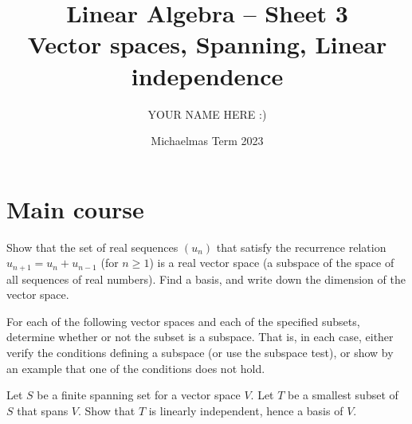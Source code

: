 \documentclass[answers]{exam}
\title{Linear Algebra -- Sheet 3\\Vector spaces, Spanning, Linear independence}
\author{YOUR NAME HERE :)}
\date{Michaelmas Term 2023}
\begin{document}
\maketitle
\section*{Main course}
\begin{questions}

\question%
Show that the set of real sequences $\left(u_{n}\right)$ that satisfy the recurrence relation $u_{n+1}=u_{n}+u_{n-1}$ (for $n \geqslant 1$) is a real vector space (a subspace of the space of all sequences of real numbers). Find a basis, and write down the dimension of the vector space.



\question%
For each of the following vector spaces and each of the specified subsets, determine whether or not the subset is a subspace. That is, in each case, either verify the conditions defining a subspace (or use the subspace test), or show by an example that one of the conditions does not hold.



\question%
Let $S$ be a finite spanning set for a vector space $V$. Let $T$ be a smallest subset of $S$ that spans $V$. Show that $T$ is linearly independent, hence a basis of $V$.




\end{questions}
\end{document}
